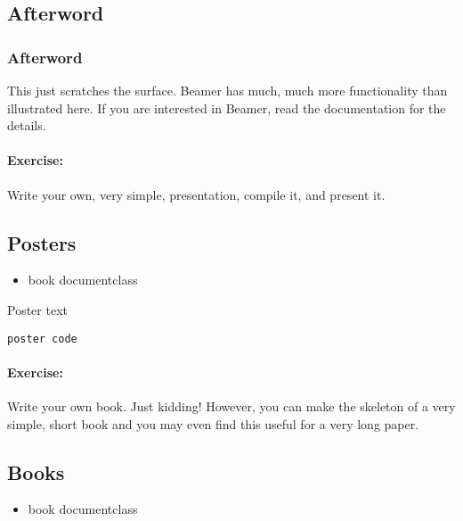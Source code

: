 \begin{realverbatim}
    \section{Afterword}
    \begin{frame}
        \frametitle{Afterword}
        This just scratches the surface. Beamer has much, much more functionality than illustrated here. If you are interested in Beamer, read the documentation for the details.
    \end{frame}

        \end{realverbatim}

        \paragraph{Exercise:} Write your own, very simple, presentation, compile it, and present it.


        \subsection{Posters}
        \label{Posters}
        
        \begin{framed}
            \begin{itemize}
                \item{book documentclass}
            \end{itemize}
        \end{framed}

        Poster text

        \begin{verbatim}
poster code        
        \end{verbatim}

        \paragraph{Exercise:} Write your own book. Just kidding! However, you can make the skeleton of a very simple, short book and you may even find this useful for a very long paper.

        \subsection{Books}
        \label{Books}
        
        \begin{framed}
            \begin{itemize}
                \item{book documentclass}
            \end{itemize}
        \end{framed}

